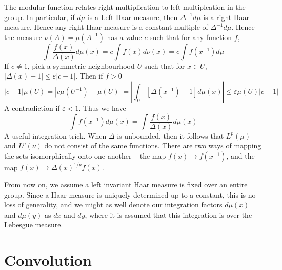 The modular function relates right multiplication to left multiplcation in the group. In particular, if $d \mu$ is a Left Haar measure, then $\Delta^{-1} d\mu$ is a right Haar measure. Hence any right Haar measure is a constant multiple of $\Delta^{-1} d\mu$. Hence the measure $\nu(A) = \mu(A^{-1})$ has a value $c$ such that for any function $f$,
%
\[ \int \frac{f(x)}{\Delta(x)} d\mu(x) = c \int f(x) d\nu(x) = c \int f(x^{-1}) d\mu \]
%
If $c \neq 1$, pick a symmetric neighbourhood $U$ such that for $x \in U$, $|\Delta(x) - 1| \leq \varepsilon |c - 1|$. Then if $f > 0$
%
\[ |c-1|\mu(U) = |c\mu(U^{-1}) - \mu(U)| = \left| \int_U [\Delta(x^{-1}) - 1] d\mu(x) \right| \leq \varepsilon \mu(U) |c-1| \]
%
A contradiction if $\varepsilon < 1$. Thus we have
%
\[ \int f(x^{-1}) d\mu(x) = \int \frac{f(x)}{\Delta(x)} d\mu(x) \]
%
A useful integration trick. When $\Delta$ is unbounded, then it follows that $L^p(\mu)$ and $L^p(\nu)$ do not consist of the same functions. There are two ways of mapping the sets isomorphically onto one another -- the map $f(x) \mapsto f(x^{-1})$, and the map $f(x) \mapsto \Delta(x)^{1/p} f(x)$.

From now on, we assume a left invariant Haar measure is fixed over an entire group. Since a Haar measure is uniquely determined up to a constant, this is no loss of generality, and we might as well denote our integration factors $d\mu(x)$ and $d\mu(y)$ as $dx$ and $dy$, where it is assumed that this integration is over the Lebesgue measure.

\section{Convolution}

